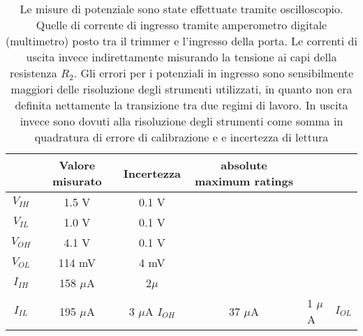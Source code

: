 \begin{table}[h]
	\centering
	\begin{tabular}{*{4}{S[table-figures-exponent = 2]} }
		{} & {Valore misurato} & {Incertezza} & {absolute maximum ratings} \\
		\midrule
    $V_{IH}$ & 1.5 V & 0.1 V\\
    $V_{IL}$ & 1.0 V & 0.1 V\\
    $V_{OH}$ & 4.1 V & 0.1 V\\
    $V_{OL}$ & 114 mV & 4 mV\\
    $I_{IH}$ & 158 $\mu$A &  2$\mu$\\
    $I_{IL}$ & 195 $\mu$A& 3 $\mu$A
    $I_{OH}$ & 37 $\mu$A& 1 $\mu$A&
    $I_{OL}$ & 
	
  
 	\end{tabular}
	\caption{ Le misure di potenziale sono state effettuate tramite oscilloscopio. Quelle di corrente di ingresso tramite amperometro digitale (multimetro) posto tra il trimmer e l'ingresso della porta. Le correnti di uscita invece indirettamente misurando la tensione ai capi della resistenza $R_{2}$. Gli errori per i potenziali in ingresso sono sensibilmente maggiori delle risoluzione degli strumenti utilizzati, in quanto non era definita nettamente la transizione tra due regimi di lavoro. In uscita invece sono dovuti alla risoluzione degli strumenti come somma in quadratura di errore di calibrazione e e incertezza di lettura}
	\label{t:tabella2}
\end{table}